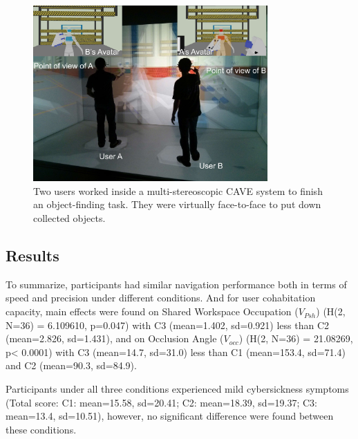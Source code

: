 \begin{figure}[htb]
  \centering
  \includegraphics[width=0.8\textwidth]{figures/ch4/teaser_exp1}
  \caption{\label{fig:4_teaser_exp1}Two users worked inside a multi-stereoscopic CAVE system to finish an object-finding task. They were virtually face-to-face to put down collected objects.}
\end{figure}

\subsection{Results}
To summarize, participants had similar navigation performance both in terms of speed and precision under different conditions. And for user cohabitation capacity, main effects were found on Shared Workspace Occupation ($V_{Psh}$) (H(2, N=36) = 6.109610, p=0.047) with C3 (mean=1.402, sd=0.921) less than C2 (mean=2.826, sd=1.431), and on Occlusion Angle ($V_{occ}$) (H(2, N=36) = 21.08269, p\textless{} 0.0001) with C3 (mean=14.7, sd=31.0) less than C1 (mean=153.4, sd=71.4) and C2 (mean=90.3, sd=84.9).

Participants under all three conditions experienced mild cybersickness symptoms (Total score: C1: mean=15.58, sd=20.41; C2: mean=18.39, sd=19.37; C3: mean=13.4, sd=10.51), however, no significant difference were found between these conditions.

